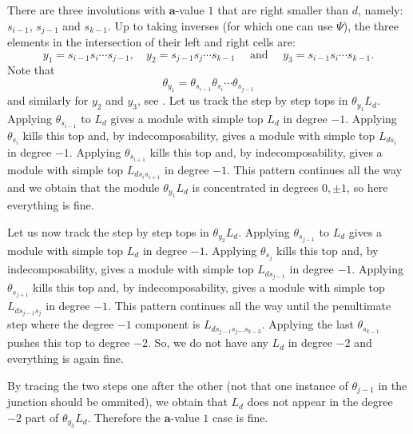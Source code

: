 \documentclass[a4paper]{amsart}
\begin{document}
There are three involutions with $\mathbf{a}$-value $1$ that are right smaller
than $d$, namely: $s_{i-1}$, $s_{j-1}$ and $s_{k-1}$.
Up to taking inverses (for which one can use $\Psi$), the three elements in the
intersection of their left and right cells are:
\begin{displaymath}
y_1= s_{i-1}s_{i}\cdots s_{j-1},\quad
y_2= s_{j-1}s_{j}\cdots s_{k-1}\quad\text{ and }\quad
y_3= s_{i-1}s_{i}\cdots s_{k-1}.
\end{displaymath}
Note that 
\begin{displaymath}
\theta_{y_1}= \theta_{s_{i-1}}\theta_{s_{i}}\cdots \theta_{s_{j-1}}
\end{displaymath}
and similarly for $y_2$ and $y_3$, see \cite{BW}.
Let us track the step by step tops in $\theta_{y_1}L_d$.
Applying $\theta_{s_{i-1}}$ to $L_d$ gives a module with 
simple top $L_d$ in degree $-1$. Applying $\theta_{s_{i}}$ 
kills this top and, by indecomposability, gives a module with 
simple top $L_{ds_{i}}$ in degree $-1$. Applying $\theta_{s_{i+1}}$ 
kills this top and, by indecomposability, gives a module with 
simple top $L_{ds_{i}s_{i+1}}$ in degree $-1$. This pattern
continues all the way and we obtain that the
module $\theta_{y_1}L_d$ is concentrated
in degrees $0,\pm 1$, so here everything is fine.

Let us now track the step by step tops in $\theta_{y_2}L_d$.
Applying $\theta_{s_{j-1}}$ to $L_d$ gives a module with 
simple top $L_d$ in degree $-1$. Applying $\theta_{s_{j}}$ 
kills this top and, by indecomposability, gives a module with 
simple top $L_{ds_{j-1}}$ in degree $-1$. Applying $\theta_{s_{j+1}}$ 
kills this top and, by indecomposability, gives a module with 
simple top $L_{ds_{j-1}s_{j}}$ in degree $-1$. This pattern
continues all the way until the penultimate step where
the degree $-1$ component is $L_{ds_{j-1}s_{j}\dots s_{k-3}}$.
Applying the last $\theta_{s_{k-1}}$ pushes this top to 
degree $-2$. So, we do not have any $L_d$ in degree $-2$
and everything is again fine.

By tracing the two steps one after the other
(not that one instance of $\theta_{j-1}$ in the junction should be ommited), we obtain that
$L_d$ does not appear in 
the degree $-2$ part of $\theta_{y_3}L_d$. Therefore
the $\mathbf{a}$-value $1$ case is fine.
\end{document}
